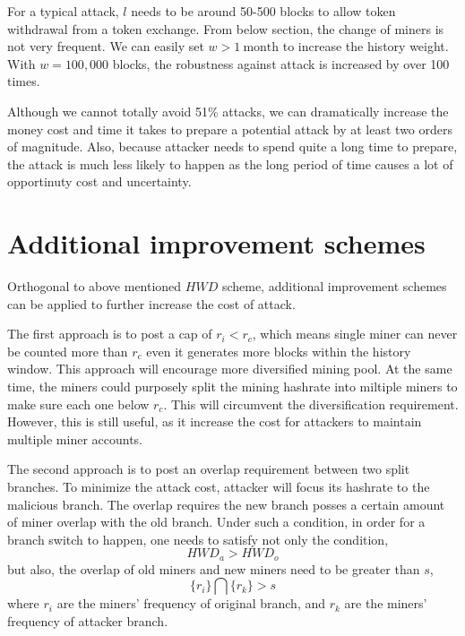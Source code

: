 \documentclass[conference]{IEEEtran}
\begin{document}
For a typical attack, $l$ needs to be around 50-500 blocks to allow token withdrawal from a token exchange. From below section, the change of miners is not very frequent. We can easily set $w > 1\ \text{month}$ to increase the history weight. With $w = 100,000$ blocks, the robustness against attack is increased by over 100 times. 

Although we cannot totally avoid 51\% attacks, we can dramatically increase the money cost and time it takes to prepare a potential attack by at least two orders of magnitude. Also, because attacker needs to spend quite a long time to prepare, the attack is much less likely to happen as the long period of time causes a lot of opportinuty cost and uncertainty.  


\section{Additional improvement schemes}

Orthogonal to above mentioned ${H\!W\!D}$ scheme, additional improvement schemes can be applied to further increase the cost of attack. 

The first approach is to post a cap of $r_i < r_c$, which means single miner can never be counted more than $r_c$ even it generates more blocks within the history window. This approach will encourage more diversified mining pool. At the same time, the miners could purposely split the mining hashrate into miltiple miners to make sure each one below $r_c$. This will circumvent the diversification requirement. However, this is still useful, as it increase the cost for attackers to maintain multiple miner accounts. 


The second approach is to post an overlap requirement between two split branches. To minimize the attack cost, attacker will focus its hashrate to the malicious branch. The overlap requires the new branch posses a certain amount of miner overlap with the old branch. Under such a condition, in order for a branch switch to happen, one needs to satisfy not only the  condition,
\begin{equation}
    H\!W\!D_a>H\!W\!D_o\label{eq_hwd_ineq}
\end{equation} 
but also, the overlap of old miners and new miners need to be greater than $s$,
\begin{equation}
    \{r_i\}\bigcap\{r_k\}>s\label{eq_overlap}
\end{equation}
where $r_i$ are the miners' frequency of original branch, and $r_k$ are the miners' frequency of attacker branch. 
\end{document}
